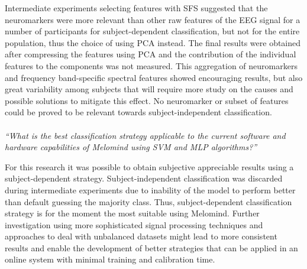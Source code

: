Intermediate experiments selecting features with \ac{SFS} suggested that the neuromarkers were more relevant than other raw features of the EEG signal for a number of participants for subject-dependent classification, but not for the entire population, thus the choice of using \ac{PCA} instead.
The final results were obtained after compressing the features using \ac{PCA} and the contribution of the individual features to the components was not measured. This aggregation of neuromarkers and frequency band-specific spectral features showed encouraging results, but also great variability among subjects that will require more study on the causes and possible solutions to mitigate this effect.  No neuromarker or subset of features could be proved to be relevant towards subject-independent classification.
\\
\\
\emph{“What is the best classification strategy applicable to the current software and hardware capabilities of Melomind using SVM and MLP algorithms?”}

For this research it was possible to obtain subjective appreciable results using a subject-dependent strategy. Subject-independent classification was discarded during intermediate experiments due to inability of the model to perform better than default guessing the majority class. Thus, subject-dependent classification strategy is for the moment the most suitable using Melomind. Further investigation using more sophisticated signal processing techniques and approaches to deal with unbalanced datasets might lead to more consistent results and enable the development of better strategies that can be applied in an online system with minimal training and calibration time.



